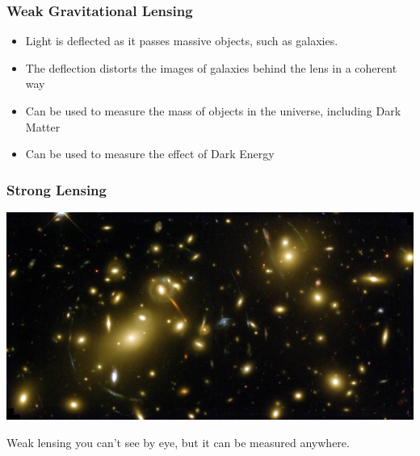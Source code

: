 \documentclass{beamer}
\begin{document}
\frame
{
    \frametitle{Weak Gravitational Lensing}

 
    \begin{itemize}

        \item Light is deflected as it passes massive objects, such as galaxies.

        \item The deflection distorts the images of galaxies behind the lens in a
            coherent way

        \item Can be used to measure the mass of objects in the universe, including Dark Matter

        \item Can be used to measure the effect of Dark Energy

    \end{itemize}

}

{

    \frame
    {
        \frametitle{Strong Lensing}
        \begin{center}
            \includegraphics[width=1.0\textwidth]{abell2218.jpg}
            \newline
        \end{center}
        Weak lensing you can't see by eye, but it can be measured anywhere.

    }

}
\end{document}
